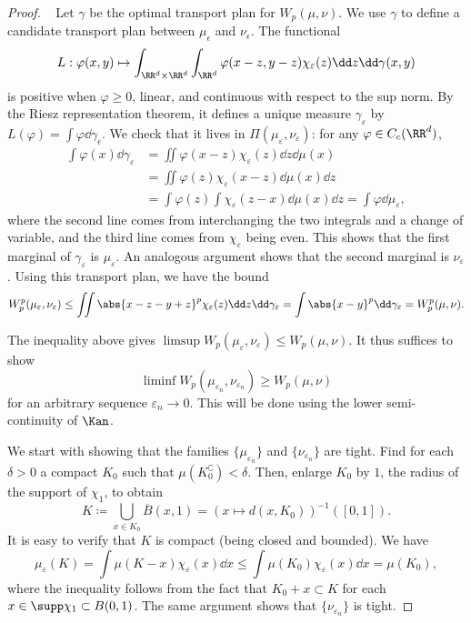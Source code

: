 \documentclass[oneside,reqno,letterpaper]{amsart}
\begin{document}
\begin{proof}~
  Let \(\gamma\) be the optimal transport plan for \(W_p(\mu, \nu)\).
  We use \(\gamma\) to define a candidate transport plan between \(\mu_{\epsilon}\) and \(\nu_{\epsilon}\).
  The functional
  \[
    L
    : \varphi(x, y)
    \mapsto
    \int_{\RR^d \times \RR^d} \int_{\RR^d} \varphi(x - z, y - z) \chi_{\varepsilon}(z) \dd z \dd \gamma(x, y)
  \]
  is positive when \(\varphi \geq 0\), linear, and continuous with respect to the sup norm.
  By the Riesz representation theorem, it defines a unique measure \(\gamma_{\varepsilon}\) by \(L(\varphi) = \int \varphi \dd \gamma_{\epsilon}\).
  We check that it lives in \(\Pi(\mu_{\varepsilon}, \nu_{\varepsilon})\):
  for any \(\varphi \in C_c(\RR^d)\),
  \begin{align*}
    \int \varphi(x) \dd \gamma_{\varepsilon}
    &= \iint \varphi(x - z) \chi_{\varepsilon}(z) \dd z \dd \mu(x) \\
    &= \iint \varphi(z) \chi_{\varepsilon}(x - z) \dd \mu(x) \dd z \\
    &= \int \varphi(z) \int \chi_{\varepsilon}(z - x) \dd \mu(x) \dd z
    = \int \varphi \dd \mu_{\varepsilon},
  \end{align*}
  where the second line comes from interchanging the two integrals and a change of variable, and the third line comes from \(\chi_{\varepsilon}\) being even.
  This shows that the first marginal of \(\gamma_{\varepsilon}\) is \(\mu_{\varepsilon}\).
  An analogous argument shows that the second marginal is \(\nu_{\varepsilon}\).
  Using this transport plan, we have the bound
  \[
    W_p^p(\mu_{\varepsilon}, \nu_{\varepsilon})
    \leq \iint \abs{x - z - y + z}^p \chi_{\varepsilon}(z) \dd z \dd \gamma_{\varepsilon}
    = \int \abs{x - y}^p \dd \gamma_{\varepsilon}
    = W_p^p(\mu, \nu).
  \]

  The inequality above gives \(\limsup W_p(\mu_{\varepsilon}, \nu_{\varepsilon}) \leq W_p(\mu, \nu)\).
  It thus suffices to show
  \[
    \liminf W_p(\mu_{\varepsilon_n}, \nu_{\varepsilon_n}) \geq W_p(\mu, \nu)
  \]
  for an arbitrary sequence \(\varepsilon_n \to 0\).
  This will be done using the lower semi-continuity of \(\Kan\).

  We start with showing that the families \(\{\mu_{\varepsilon_n}\}\) and \(\{\nu_{\varepsilon_n}\}\) are tight.
  Find for each \(\delta > 0\) a compact \(K_0\) such that \(\mu(K_0^\complement) < \delta\).
  Then, enlarge \(K_0\) by \(1\), the radius of the support of \(\chi_1\), to obtain
  \[
    K
    \coloneqq \bigcup_{x \in K_0} \overline{B}(x, 1)
    = \left( x \mapsto d(x, K_0) \right)^{-1} ([0, 1]).
  \]
  It is easy to verify that \(K\) is compact (being closed and bounded).
  We have
  \[
    \mu_{\varepsilon}(K)
    = \int \mu(K - x) \chi_{\varepsilon}(x) \dd x
    \leq \int \mu(K_0) \chi_{\varepsilon}(x) \dd x
    = \mu(K_0),
  \]
  where the inequality follows from the fact that \(K_0 + x \subset K\) for each \(x \in \supp \chi_1 \subset B(0, 1)\).
  The same argument shows that \(\{\nu_{\varepsilon_n}\}\) is tight.


\end{proof}
\end{document}
